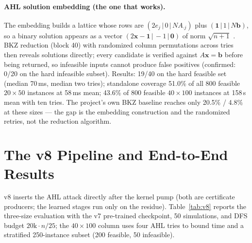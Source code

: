 \documentclass[12pt]{article}
\begin{document}
\paragraph{AHL solution embedding (the one that works).} The embedding builds a lattice whose rows are $(2e_j \,|\, 0 \,|\, N A_{\cdot j})$ plus $(\mathbf{1} \,|\, 1 \,|\, N \mathbf{b})$, so a binary solution appears as a vector $(2\mathbf{x} - \mathbf{1} \,|\, -1 \,|\, \mathbf{0})$ of norm $\sqrt{n+1}$ \citep{aardal2000market, schnorr1994lattice}. BKZ reduction (block 40) with randomized column permutations across tries then reveals solutions directly; every candidate is verified against $A\mathbf{x} = \mathbf{b}$ before being returned, so infeasible inputs cannot produce false positives (confirmed: 0/20 on the hard infeasible subset). Results: 19/40 on the hard feasible set (median 70\,ms, median two tries); standalone coverage 51.0\% of all 800 feasible $20 \times 50$ instances at 58\,ms mean; 43.6\% of 800 feasible $40 \times 100$ instances at 158\,s mean with ten tries. The project's own BKZ baseline reaches only 20.5\% / 4.8\% at these sizes --- the gap is the embedding construction and the randomized retries, not the reduction algorithm.

\section{The v8 Pipeline and End-to-End Results}

v8 inserts the AHL attack directly after the kernel pump (both are certificate producers; the learned stages run only on the residue). Table~\ref{tab:v8} reports the three-size evaluation with the v7 pre-trained checkpoint, 50 simulations, and DFS budget $20\mathrm{k} \cdot n/25$; the $40 \times 100$ column uses four AHL tries to bound time and a stratified 250-instance subset (200 feasible, 50 infeasible).
\end{document}
